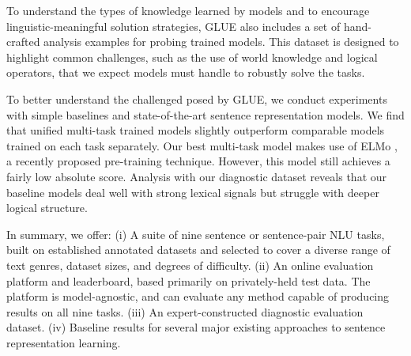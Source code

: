 \documentclass{article} \usepackage{iclr2019_conference,times}
\begin{document}
To understand the types of knowledge learned by models and to encourage linguistic-meaningful solution strategies, GLUE also includes a set of hand-crafted analysis examples for probing trained models. 
This dataset is designed to highlight common challenges, such as the use of world knowledge and logical operators, that we expect models must handle to robustly solve the tasks.

To better understand the challenged posed by GLUE, we conduct experiments with simple baselines and state-of-the-art sentence representation models.
We find that unified multi-task trained models slightly outperform comparable models trained on each task separately.
Our best multi-task model makes use of ELMo \citep{peters2018deep},
a recently proposed pre-training technique.
However, this model still achieves a fairly low absolute score.
Analysis with our diagnostic dataset reveals that our baseline models deal well with strong lexical signals but struggle with deeper logical structure.

In summary, we offer: (i) A suite of nine sentence or sentence-pair NLU tasks, built on established annotated datasets and selected to cover a diverse range of text genres, dataset sizes, and degrees of difficulty. (ii) An online evaluation platform and leaderboard, based primarily on privately-held test data. The platform is model-agnostic, and can evaluate any method capable of producing results on all nine tasks. (iii) An expert-constructed diagnostic evaluation dataset. (iv) Baseline results for several major existing approaches to sentence representation learning.
\end{document}
